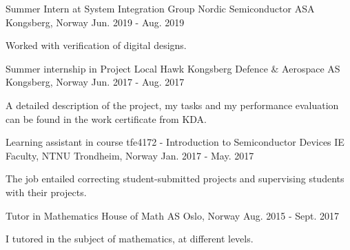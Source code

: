 \begin{cventries}
    \cventry
    {Summer Intern at System Integration Group}
    {Nordic Semiconductor ASA}
    {Kongsberg, Norway}
    {Jun. 2019 - Aug. 2019}
    {      
      \begin{cvitems}
        \item {Worked with verification of digital designs.}
      \end{cvitems}
    }
    \cventry
    {Summer internship in Project Local Hawk}
    {Kongsberg Defence $\&$ Aerospace AS}
    {Kongsberg, Norway}
    {Jun. 2017 - Aug. 2017}
    {      
      \begin{cvitems}
        \item {A detailed description of the project, my tasks and my performance evaluation can be found in the work certificate from KDA.}
      \end{cvitems}
    }
    \cventry
    {Learning assistant in course tfe4172 - Introduction to Semiconductor Devices}
    {IE Faculty, NTNU}
    {Trondheim, Norway}
    {Jan. 2017 - May. 2017}
    {      
      \begin{cvitems}
        \item {The job entailed correcting student-submitted projects and supervising students with their projects.}
      \end{cvitems}
    }
    \cventry
    {Tutor in Mathematics}
    {House of Math AS}
    {Oslo, Norway}
    {Aug. 2015 - Sept. 2017}
    {
      \begin{cvitems}
        \item {I tutored in the subject of mathematics, at different levels.}
      \end{cvitems}
    }
\end{cventries}
